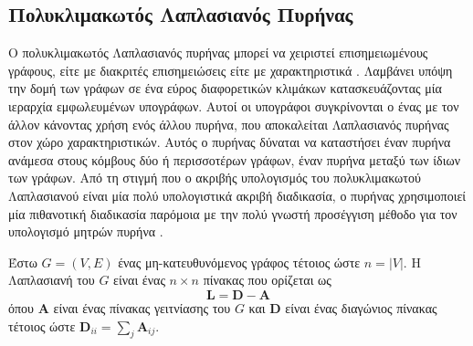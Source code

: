 \subsection{Πολυκλιμακωτός Λαπλασιανός Πυρήνας}
\label{ssec:ml}
Ο πολυκλιμακωτός Λαπλασιανός πυρήνας μπορεί να χειριστεί επισημειωμένους γράφους, είτε με διακριτές επισημειώσεις είτε με χαρακτηριστικά \cite{kondor2016multiscale}.
Λαμβάνει υπόψη την δομή των γράφων σε ένα εύρος διαφορετικών κλιμάκων κατασκευάζοντας μία ιεραρχία εμφωλευμένων υπογράφων.
Αυτοί οι υπογράφοι συγκρίνονται ο ένας με τον άλλον κάνοντας χρήση ενός άλλου πυρήνα, που αποκαλείται Λαπλασιανός πυρήνας στον χώρο χαρακτηριστικών.
Αυτός ο πυρήνας δύναται να καταστήσει έναν πυρήνα ανάμεσα στους κόμβους δύο ή περισσοτέρων γράφων, έναν πυρήνα μεταξύ των ίδιων των γράφων.
Από τη στιγμή που ο ακριβής υπολογισμός του πολυκλιμακωτού Λαπλασιανού είναι μία πολύ υπολογιστικά ακριβή διαδικασία, ο πυρήνας χρησιμοποιεί μία πιθανοτική διαδικασία παρόμοια με την πολύ γνωστή προσέγγιση μέθοδο  για τον υπολογισμό μητρών πυρήνα \cite{williams2001using}.

Έστω $G=(V,E)$ ένας μη-κατευθυνόμενος γράφος τέτοιος ώστε $n = |V|$.
Η Λαπλασιανή του $G$ είναι ένας $n \times n$ πίνακας που ορίζεται ως
\begin{equation*}
    \mathbf{L} = \mathbf{D} - \mathbf{A} 
\end{equation*}
όπου $\mathbf{A}$ είναι ένας πίνακας γειτνίασης του $G$ και $\mathbf{D}$ είναι ένας διαγώνιος πίνακας τέτοιος ώστε $\mathbf{D}_{ii} = \sum_j \mathbf{A}_{ij}$.

